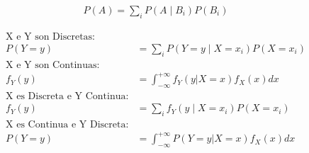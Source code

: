 \documentclass{article}
\begin{document}
	\maketitle
  \thispagestyle{empty}



  \begin{align}
    P(A) = \sum_iP(A \mid B_i)P(B_i)
  \end{align}

  \begin{align}
    \text{X e Y son Discretas:}&\\
    P(Y=y) &= \sum_iP(Y = y \mid X = x_i)P(X = x_i)\\
    \text{X e Y son Continuas:}&\\
    f_{Y}(y) &=\int_{-\infty}^{+\infty}f_{Y}(y | X = x)f_X(x) dx \\
    \text{X es Discreta e Y Continua:}&\\
    f_{Y}(y) &= \sum_if_{Y}(y \mid X = x_i)P(X = x_i)\\
    \text{X es Continua e Y Discreta:}&\\
    P(Y = y) &=\int_{-\infty}^{+\infty}P( Y =y | X = x)f_X(x) dx \\
  \end{align}
	\nocite{prob2017}

  
  
\end{document}
